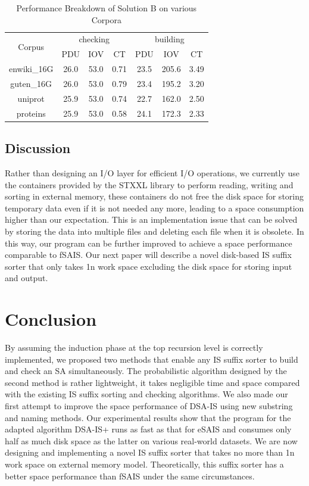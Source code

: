 \documentclass[10pt,journal,compsoc]{IEEEtran}
\begin{document}
\begin{table}%
	\caption{Performance Breakdown of Solution B on various Corpora}
	\label{tbl:breakdown_solutionb}
	\centering
	\begin{tabular}{|c|c|c|c|c|c|c|}
		\hline
		\multirow{2}{*}{Corpus} & \multicolumn{3}{|c}{checking} & \multicolumn{3}{|c|}{building} \\\cline{2-7}
		& PDU & IOV & CT & PDU & IOV & CT \\\hline
		enwiki\_16G & 26.0 & 53.0 & 0.71 & 23.5 & 205.6 & 3.49 \\\hline
		guten\_16G & 26.0 & 53.0 & 0.79 & 23.4 & 195.2 & 3.20 \\\hline
		uniprot & 25.9 & 53.0 & 0.74 & 22.7 & 162.0 & 2.50 \\\hline
		proteins & 25.9 & 53.0 & 0.58 & 24.1 & 172.3 & 2.33 \\\hline
	\end{tabular}
\end{table}%

\subsection{Discussion}

Rather than designing an I/O layer for efficient I/O operations, we currently use the containers provided by the STXXL library to perform reading, writing and sorting in external memory, these containers do not free the disk space for storing temporary data even if it is not needed any more, leading to a space consumption higher than our expectation. This is an implementation issue that can be solved by storing the data into multiple files and deleting each file when it is obsolete. In this way, our program can be further improved to achieve a space performance comparable to fSAIS. Our next paper will describe a novel disk-based IS suffix sorter that only takes 1n work space excluding the disk space for storing input and output. 

\section{Conclusion} \label{sec:conclusion}

By assuming the induction phase at the top recursion level is correctly implemented, we proposed two methods that enable any IS suffix sorter to build and check an SA simultaneously. The probabilistic algorithm designed by the second method is rather lightweight, it takes negligible time and space compared with the existing IS suffix sorting and checking algorithms. We also made our first attempt to improve the space performance of DSA-IS using new substring and naming methods. Our experimental results show that the program for the adapted algorithm DSA-IS+ runs as fast as that for eSAIS and consumes only half as much disk space as the latter on various real-world datasets. We are now designing and implementing a novel IS suffix sorter that takes no more than 1n work space on external memory model. Theoretically, this suffix sorter has a better space performance than fSAIS under the same circumstances. 



\end{document}
